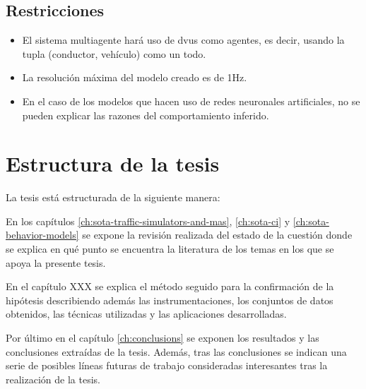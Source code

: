 \subsection{Restricciones}

\begin{itemize}
	\item El sistema multiagente hará uso de \Acp{dvu} como agentes, es decir, usando la tupla (conductor, vehículo) como un todo.
	\item La resolución máxima del modelo creado es de 1Hz.
	\item En el caso de los modelos que hacen uso de redes neuronales artificiales, no se pueden explicar las razones del comportamiento inferido.
\end{itemize}

\section{Estructura de la tesis}
\label{ch:intro:structure}

La tesis está estructurada de la siguiente manera:

En los capítulos \ref{ch:sota-traffic-simulators-and-mas}, \ref{ch:sota-ci} y \ref{ch:sota-behavior-models} se expone la revisión realizada del estado de la cuestión donde se explica en qué punto se encuentra la literatura de los temas en los que se apoya la presente tesis.

En el capítulo XXX se explica el método seguido para la confirmación de la hipótesis describiendo además las instrumentaciones, los conjuntos de datos obtenidos, las técnicas utilizadas y las aplicaciones desarrolladas.

Por último en el capítulo \ref{ch:conclusions} se exponen los resultados y las conclusiones extraídas de la tesis. Además, tras las conclusiones se indican una serie de posibles líneas futuras de trabajo consideradas interesantes tras la realización de la tesis.
